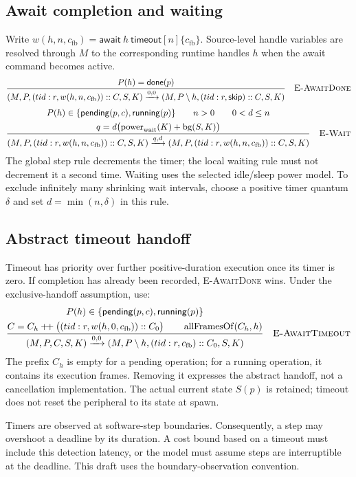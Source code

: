 \documentclass[11pt]{article}
\newcommand{\kw}[1]{\mathsf{#1}}
\newcommand{\step}[2]{\xrightarrow{#1,#2}}
\newcommand{\rulelabel}[1]{\quad\textsc{#1}}
\newcommand{\bg}{\operatorname{bg}}
\newcommand{\frm}[3]{(#1:#2,#3)}
\begin{document}
\subsection{Await completion and waiting}
Write $w(h,n,c_{\mathrm{fb}})=
\kw{await}\ h\ \kw{timeout}[n]\{c_{\mathrm{fb}}\}$.
Source-level handle variables are resolved through $M$ to the corresponding
runtime handles $h$ when the await command becomes active.
\[
\frac{P(h)=\kw{done}(p)}{
 (M,P,\frm{tid}{r}{w(h,n,c_{\mathrm{fb}})}::C,S,K)
 \step{0}{0}
 (M,P\setminus h,\frm{tid}{r}{\kw{skip}}::C,S,K)
}\rulelabel{E-AwaitDone}
\]
\[
\frac{
 \begin{gathered}
 P(h)\in\{\kw{pending}(p,c),\kw{running}(p)\}
 \qquad n>0\qquad0<d\leq n\\
 q=d\bigl(\operatorname{power}_{\mathrm{wait}}(K)+\bg(S,K)\bigr)
 \end{gathered}
}{
 (M,P,\frm{tid}{r}{w(h,n,c_{\mathrm{fb}})}::C,S,K)
 \step{q}{d}
 (M,P,\frm{tid}{r}{w(h,n,c_{\mathrm{fb}})}::C,S,K)
}\rulelabel{E-Wait}
\]
The global step rule decrements the timer; the local waiting rule must not
decrement it a second time. Waiting uses the selected idle/sleep power model.
To exclude infinitely many shrinking wait intervals, choose a positive
timer quantum $\delta$ and set $d=\min(n,\delta)$ in this rule.

\subsection{Abstract timeout handoff}\label{sec:timeout}
Timeout has priority over further positive-duration execution once its timer
is zero. If completion has already been recorded, \textsc{E-AwaitDone} wins.
Under the exclusive-handoff assumption, use:
\[
\frac{
 \begin{gathered}
 P(h)\in\{\kw{pending}(p,c),\kw{running}(p)\}\\
 C=C_h\mathbin{+\!+}
   \bigl(\frm{tid}{r}{w(h,0,c_{\mathrm{fb}})}::C_0\bigr)
 \qquad\operatorname{allFramesOf}(C_h,h)
 \end{gathered}
}{
 (M,P,C,S,K)\step{0}{0}
 (M,P\setminus h,\frm{tid}{r}{c_{\mathrm{fb}}}::C_0,S,K)
}\rulelabel{E-AwaitTimeout}
\]
The prefix $C_h$ is empty for a pending operation; for a running operation,
it contains its execution frames. Removing it expresses the abstract handoff,
not a cancellation implementation. The actual current state $S(p)$ is retained;
timeout does not reset the peripheral to its state at spawn.

Timers are observed at software-step boundaries. Consequently, a step may
overshoot a deadline by its duration. A cost bound based on a timeout must
include this detection latency, or the model must assume steps are interruptible
at the deadline. This draft uses the boundary-observation convention.
\end{document}

